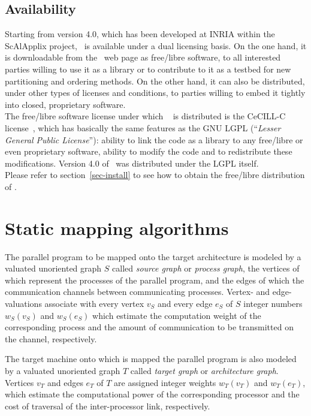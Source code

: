 \subsection{Availability}

Starting from version \textsc{4.0}, which has been developed at INRIA
within the ScAlApplix project, \scotch\ is available under a dual
licensing basis. On the one hand, it is downloadable from the
\scotch\ web page as free/libre software, to all interested parties
willing to use it as a library or to contribute to it as a testbed for
new partitioning and ordering methods. On the other hand, it can also
be distributed, under other types of licenses and conditions, to
parties willing to embed it tightly into closed, proprietary software.
\\

The free/libre software license under which \scotch\ \textsc{\scotchver}
is distributed is the CeCILL-C license~\cite{cecill}, which has
basically the same features as the GNU LGPL (``\textit{Lesser General
Public License}''): ability to link the code as a library to any
free/libre or even proprietary software, ability to modify the code
and to redistribute these modifications. Version \textsc{4.0} of
\scotch\ was distributed under the LGPL itself.
\\

Please refer to section~\ref{sec-install} to see how to obtain the
free/libre distribution of \scotch.

\section{Static mapping algorithms}
\label{sec-algo-map}

The parallel program to be mapped onto the target architecture is modeled
by a valuated unoriented graph $S$ called \emph{source graph\/} or
\emph{process graph}, the vertices of which represent the processes of the
parallel program, and the edges of which the communication channels between
communicating processes.
Vertex- and edge- valuations associate with every vertex $v_S$ and every
edge $e_S$ of $S$ integer numbers $w_S(v_S)$ and $w_S(e_S)$ which
estimate the computation weight of the corresponding process
and the amount of communication to be transmitted on the channel,
respectively.

The target machine onto which is mapped the parallel program is also
modeled by a valuated unoriented graph $T$ called \emph{target graph\/}
or \emph{architecture graph}.
Vertices $v_T$ and edges $e_T$ of $T$ are assigned integer weights
$w_T(v_T)$ and $w_T(e_T)$, which estimate the computational power of the
corresponding processor and the cost of traversal of the inter-processor
link, respectively.

